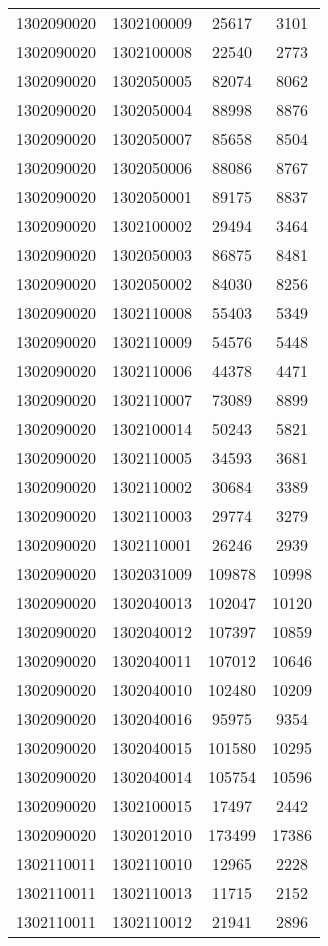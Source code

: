 \begin{longtable}[h]{llcc}
		1302090020 & 1302100009 & 25617 & 3101\\
		1302090020 & 1302100008 & 22540 & 2773\\
		1302090020 & 1302050005 & 82074 & 8062\\
		1302090020 & 1302050004 & 88998 & 8876\\
		1302090020 & 1302050007 & 85658 & 8504\\
		1302090020 & 1302050006 & 88086 & 8767\\
		1302090020 & 1302050001 & 89175 & 8837\\
		1302090020 & 1302100002 & 29494 & 3464\\
		1302090020 & 1302050003 & 86875 & 8481\\
		1302090020 & 1302050002 & 84030 & 8256\\
		1302090020 & 1302110008 & 55403 & 5349\\
		1302090020 & 1302110009 & 54576 & 5448\\
		1302090020 & 1302110006 & 44378 & 4471\\
		1302090020 & 1302110007 & 73089 & 8899\\
		1302090020 & 1302100014 & 50243 & 5821\\
		1302090020 & 1302110005 & 34593 & 3681\\
		1302090020 & 1302110002 & 30684 & 3389\\
		1302090020 & 1302110003 & 29774 & 3279\\
		1302090020 & 1302110001 & 26246 & 2939\\
		1302090020 & 1302031009 & 109878 & 10998\\
		1302090020 & 1302040013 & 102047 & 10120\\
		1302090020 & 1302040012 & 107397 & 10859\\
		1302090020 & 1302040011 & 107012 & 10646\\
		1302090020 & 1302040010 & 102480 & 10209\\
		1302090020 & 1302040016 & 95975 & 9354\\
		1302090020 & 1302040015 & 101580 & 10295\\
		1302090020 & 1302040014 & 105754 & 10596\\
		1302090020 & 1302100015 & 17497 & 2442\\
		1302090020 & 1302012010 & 173499 & 17386\\
		1302110011 & 1302110010 & 12965 & 2228\\
		1302110011 & 1302110013 & 11715 & 2152\\
		1302110011 & 1302110012 & 21941 & 2896\\

\end{longtable}
